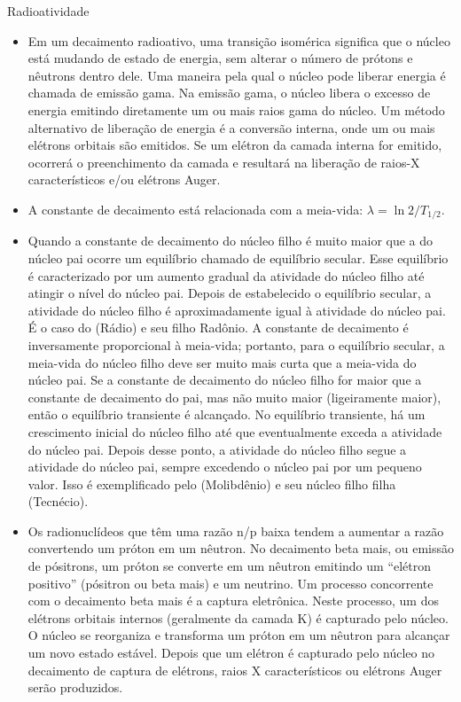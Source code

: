 \documentclass[11pt,a4paper]{article}
\newcounter{exemplo}
\begin{document}
\begin{exemplo}
    \textcolor{CarnationPink}{Radioatividade}

    \begin{itemize}
        \item Em um decaimento radioativo, uma transição isomérica significa que o núcleo está mudando de estado de energia, sem alterar o número de prótons e nêutrons dentro dele. Uma maneira pela qual o núcleo pode liberar energia é chamada de emissão gama. Na emissão gama, o núcleo libera o excesso de energia emitindo diretamente um ou mais raios gama do núcleo. Um método alternativo de liberação de energia é a conversão interna, onde um ou mais elétrons orbitais são emitidos. Se um elétron da camada interna for emitido, ocorrerá o preenchimento da camada e resultará na liberação de raios-X característicos e/ou elétrons Auger.
       
       \item A constante de decaimento está relacionada com a meia-vida: $\lambda = \ln 2 / T_{1/2}$.
       
       \item Quando a constante de decaimento do núcleo filho é muito maior que a do núcleo pai ocorre um equilíbrio chamado de equilíbrio secular. Esse equilíbrio é caracterizado por um aumento gradual da atividade do núcleo filho até atingir o nível do núcleo pai. Depois de estabelecido o equilíbrio secular, a atividade do núcleo filho é aproximadamente igual à atividade do núcleo pai. É o caso do  (Rádio) e seu filho  {Radônio}. A constante de decaimento é inversamente proporcional à meia-vida; portanto, para o equilíbrio secular, a meia-vida do núcleo filho deve ser muito mais curta que a meia-vida do núcleo pai. Se a constante de decaimento do núcleo filho for maior que a constante de decaimento do pai, mas não muito maior (ligeiramente maior), então o equilíbrio transiente é alcançado. No equilíbrio transiente, há um crescimento inicial do núcleo filho até que eventualmente exceda a atividade do núcleo pai. Depois desse ponto, a atividade do núcleo filho segue a atividade do núcleo pai, sempre excedendo o núcleo pai por um pequeno valor. Isso é exemplificado pelo  (Molibdênio) e seu núcleo filho filha  (Tecnécio). 
       
       \item Os radionuclídeos que têm uma razão n/p baixa tendem a aumentar a razão convertendo um próton em um nêutron. No decaimento beta mais, ou emissão de pósitrons, um próton se converte em um nêutron emitindo um ``elétron positivo'' (pósitron ou beta mais) e um neutrino. Um processo concorrente com o decaimento beta mais é a captura eletrônica. Neste processo, um dos elétrons orbitais internos (geralmente da camada K) é capturado pelo núcleo. O núcleo se reorganiza e transforma um próton em um nêutron para alcançar um novo estado estável. Depois que um elétron é capturado pelo núcleo no decaimento de captura de elétrons, raios X característicos ou elétrons Auger serão produzidos.
       

\end{itemize}
\end{exemplo}
\end{document}
